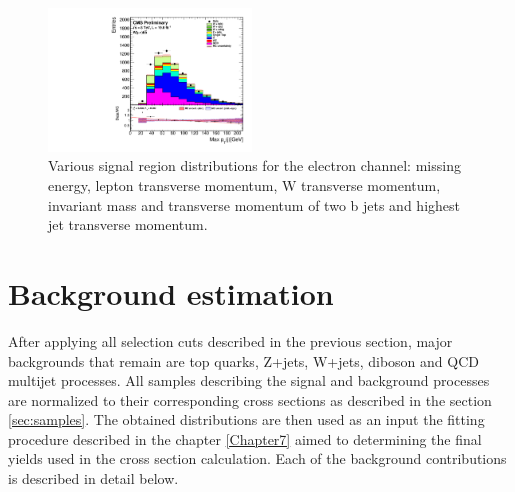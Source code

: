 \begin{figure}[htbp]
		\includegraphics[width=0.48\textwidth]{Figures/Results/Electron/prefit/Wbb_max_hJet_pt_doQCD1.pdf}		
	\caption[Signal region distributions for the electron channel]{Various signal region distributions for the electron channel: missing energy, lepton transverse momentum, W transverse momentum, invariant mass and transverse momentum of two b jets and highest jet transverse momentum. }
	\label{fig:Wbb_prefit_electron}
\end{figure}


\section{Background estimation}
\label{sec:background}
After applying all selection cuts described in the previous section, major backgrounds that remain are top quarks, Z+jets, W+jets, diboson and QCD multijet processes. All samples describing the signal and background processes are normalized to their corresponding cross sections as described in the section \ref{sec:samples}. The obtained distributions are then used as an input the fitting procedure described in the chapter \ref{Chapter7} aimed to determining the final yields used in the cross section calculation. Each of the background contributions is described in detail below. 

